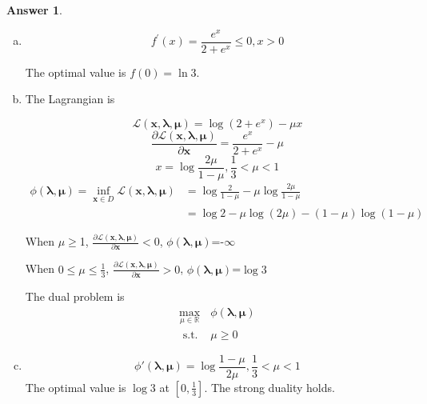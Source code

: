 \documentclass{article}
\theoremstyle{definition}
\newtheorem{ans}{Answer}
\begin{document}
	\begin{ans}
		~
		
		\begin{enumerate}[(a)]
			\item 
			$$
			f^{\prime}(x)=\frac{e^x}{2+e^x}\leq 0, x>0
			$$
			
			The optimal value is $f(0)=\ln 3$.
			
			\item The Lagrangian is 
			
			$$
			\mathcal{L}(\boldsymbol{x}, \boldsymbol{\lambda}, \boldsymbol{\mu})=\log \left(2+e^{x}\right)-\mu x
			$$
			$$
			\frac{\partial \mathcal {L}(\boldsymbol{x}, \boldsymbol{\lambda}, \boldsymbol{\mu})}{\partial \boldsymbol{x}}=\frac{e^x}{2+e^x}-\mu
			$$
			$$
			x=\log\frac{2\mu}{1-\mu}, \frac{1}{3}<\mu<1
			$$
			$$
			\begin{aligned}			
			\phi(\boldsymbol{\lambda}, \boldsymbol{\mu})=\inf _{\boldsymbol{x} \in D} \mathcal{L}(\boldsymbol{x}, \boldsymbol{\lambda}, \boldsymbol{\mu})&=\log\frac{2}{1-\mu}-\mu \log\frac{2\mu}{1-\mu}\\
			&=\log 2-\mu\log(2\mu)-(1-\mu)\log(1-\mu)
			\end{aligned}
			$$
			
			When $\mu\geq$1, $\frac{\partial \mathcal {L}(\boldsymbol{x}, \boldsymbol{\lambda}, \boldsymbol{\mu})}{\partial \boldsymbol{x}}<0$, $\phi(\boldsymbol{\lambda}, \boldsymbol{\mu})$=-$\infty$
			
			When $0\leq\mu\leq\frac{1}{3}$, $\frac{\partial \mathcal {L}(\boldsymbol{x}, \boldsymbol{\lambda}, \boldsymbol{\mu})}{\partial \boldsymbol{x}}>0$, $\phi(\boldsymbol{\lambda}, \boldsymbol{\mu})$=$\log 3$
			
			The dual problem is 
			$$
			\begin{aligned}
				\max _{{\mu} \in \mathbb{R}} & \phi(\boldsymbol{\lambda}, \boldsymbol{\mu})\\
				\text { s.t. } & \mu\geq0
			\end{aligned}
			$$
			\item 
			$$
			\phi'(\boldsymbol{\lambda}, \boldsymbol{\mu})=\log\frac{1-\mu}{2\mu}, \frac{1}{3}<\mu<1
			$$
			The optimal value is $\log 3$ at $[0,\frac{1}{3}]$. The strong duality holds.
		\end{enumerate}
	\end{ans}
\end{document}
